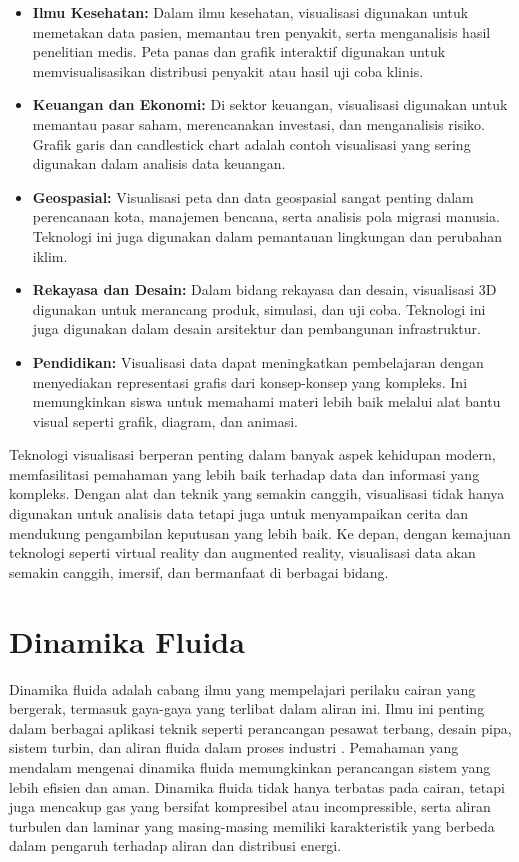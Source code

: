 \begin{itemize}
    \item \textbf{Ilmu Kesehatan:} Dalam ilmu kesehatan, visualisasi digunakan untuk memetakan data pasien, memantau tren penyakit, serta menganalisis hasil penelitian medis. Peta panas dan grafik interaktif digunakan untuk memvisualisasikan distribusi penyakit atau hasil uji coba klinis.
    \item \textbf{Keuangan dan Ekonomi:} Di sektor keuangan, visualisasi digunakan untuk memantau pasar saham, merencanakan investasi, dan menganalisis risiko. Grafik garis dan candlestick chart adalah contoh visualisasi yang sering digunakan dalam analisis data keuangan.
    \item \textbf{Geospasial:} Visualisasi peta dan data geospasial sangat penting dalam perencanaan kota, manajemen bencana, serta analisis pola migrasi manusia. Teknologi ini juga digunakan dalam pemantauan lingkungan dan perubahan iklim.
    \item \textbf{Rekayasa dan Desain:} Dalam bidang rekayasa dan desain, visualisasi 3D digunakan untuk merancang produk, simulasi, dan uji coba. Teknologi ini juga digunakan dalam desain arsitektur dan pembangunan infrastruktur.
    \item \textbf{Pendidikan:} Visualisasi data dapat meningkatkan pembelajaran dengan menyediakan representasi grafis dari konsep-konsep yang kompleks. Ini memungkinkan siswa untuk memahami materi lebih baik melalui alat bantu visual seperti grafik, diagram, dan animasi.
\end{itemize}

Teknologi visualisasi berperan penting dalam banyak aspek kehidupan modern, memfasilitasi pemahaman yang lebih baik terhadap data dan informasi yang kompleks. Dengan alat dan teknik yang semakin canggih, visualisasi tidak hanya digunakan untuk analisis data tetapi juga untuk menyampaikan cerita dan mendukung pengambilan keputusan yang lebih baik. Ke depan, dengan kemajuan teknologi seperti virtual reality dan augmented reality, visualisasi data akan semakin canggih, imersif, dan bermanfaat di berbagai bidang.


\section{Dinamika Fluida}
\label{subsec:dinamikafluida}

Dinamika fluida adalah cabang ilmu yang mempelajari perilaku cairan yang bergerak, termasuk gaya-gaya yang terlibat dalam aliran ini. Ilmu ini penting dalam berbagai aplikasi teknik seperti perancangan pesawat terbang, desain pipa, sistem turbin, dan aliran fluida dalam proses industri \cite{white2011fluid}. Pemahaman yang mendalam mengenai dinamika fluida memungkinkan perancangan sistem yang lebih efisien dan aman. Dinamika fluida tidak hanya terbatas pada cairan, tetapi juga mencakup gas yang bersifat kompresibel atau incompressible, serta aliran turbulen dan laminar yang masing-masing memiliki karakteristik yang berbeda dalam pengaruh terhadap aliran dan distribusi energi.

